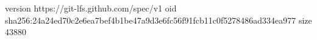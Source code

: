 version https://git-lfs.github.com/spec/v1
oid sha256:24a24ed70c2e6ea7bef4b1be47a9d3e6fc56f91fcb11c0f5278486ad334ea977
size 43880
